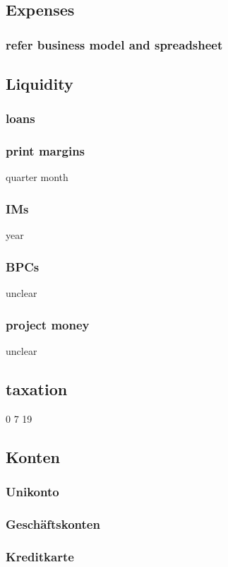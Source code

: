 \documentclass[output=guidelines,guidelines] {langscibook}
\begin{document}
\subsection{Expenses}
\subsubsection{refer business model and spreadsheet}
\subsection{Liquidity}
\subsubsection{loans}
\subsubsection{print margins}
                    quarter
                    month
\subsubsection{IMs}
                    year
\subsubsection{BPCs}
                    unclear
\subsubsection{project money}
                    unclear
\subsection{taxation}
                0
                7
                19
\subsection{Konten}
\subsubsection{Unikonto}
\subsubsection{Geschäftskonten}
\subsubsection{Kreditkarte}
\end{document}
